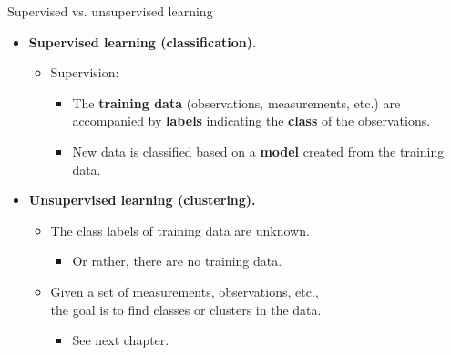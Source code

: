 \documentclass[aspectratio=169,t,table]{beamer}
\begin{document}
  {
    \begin{frame}{Supervised vs. unsupervised learning}
        \begin{itemize}
            \item \textbf{\color{airforceblue}Supervised learning (classification).}
            \begin{itemize}
              \item Supervision:
              \begin{itemize}
                \item The \textbf{training data} (observations, measurements, etc.) are accompanied by \textbf{labels} indicating the \textbf{class} of the observations.
                \item New data is classified based on a \textbf{model} created from the training data.
              \end{itemize}
            \end{itemize}
            \item \textbf{\color{airforceblue}Unsupervised learning (clustering).}
            \begin{itemize}
              \item The class labels of training data are unknown.
              \begin{itemize}
                \item Or rather, there are no training data.
              \end{itemize}
            \end{itemize}
            \begin{itemize}
              \item Given a set of measurements, observations, etc., \\ the goal is to find classes or clusters in the data.
              \begin{itemize}
                \item See next chapter.
              \end{itemize}
            \end{itemize}
        \end{itemize}
    \end{frame}
  }
\end{document}
